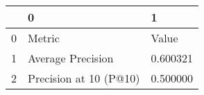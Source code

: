 \begin{tabular}{lll}
\toprule
 & 0 & 1 \\
\midrule
0 & Metric & Value \\
1 & Average Precision & 0.600321 \\
2 & Precision at 10 (P@10) & 0.500000 \\
\bottomrule
\end{tabular}
